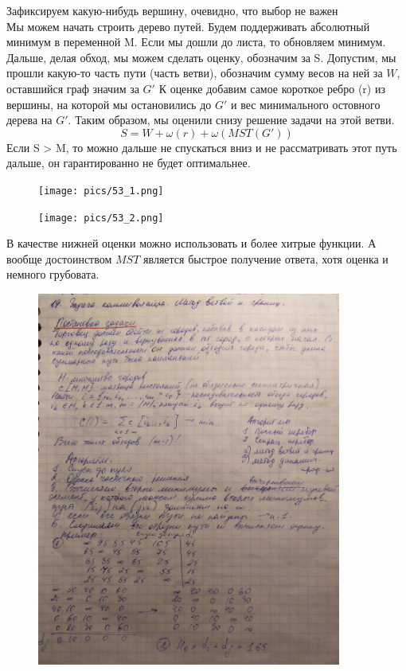 \documentclass[discrete.tex]{subfiles}
\begin{document}
    \begin{task}[решение ]
        Зафиксируем какую-нибудь вершину, очевидно, что выбор не важен\\
        Мы можем начать строить дерево путей.
        Будем поддерживать абсолютный минимум в переменной M.
        Если мы дошли до листа, то обновляем минимум. Дальше, делая обход,
        мы можем сделать оценку, обозначим за S.
        Допустим, мы прошли какую-то часть пути (часть ветви),
        обозначим
        сумму весов на ней за $W$, оставшийся граф значим за $G'$
        К оценке добавим самое короткое ребро (r) из вершины, на которой
        мы остановились до $G'$ и вес минимального остовного дерева на $G'$.
        Таким образом, мы оценили снизу решение задачи на этой ветви.
        \[S = W + \omega(r) + \omega(MST(G'))\]
        Если S > M, то можно дальше не спускаться вниз и не рассматривать этот
        путь дальше, он гарантированно не будет оптимальнее.
        \begin{figure}[H]
            \texttt{[image: pics/53\_1.png]}
            \centering
        \end{figure}
        \begin{figure}[H]
            \texttt{[image: pics/53\_2.png]}
            \centering
        \end{figure}

        В качестве нижней оценки можно использовать и более хитрые функции. А
        вообще достоинством $MST$ является быстрое получение ответа, хотя оценка
        и немного грубовата.
    \end{task}

    \begin{figure}[H]
            \includegraphics[width=10cm]{pics/53_3}
            \centering
    \end{figure}
\end{document}
